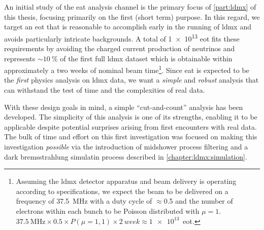 An initial study of the \ac{eat} analysis channel is the primary focus of \cref{part:ldmx} of this
thesis, focusing primarily on the first (short term) purpose. In this regard, we target an \ac{eot}
that is reasonable to accomplish early in the running of \ac{ldmx} and avoids particularly
intricate backgrounds. A total of \num{1e13} \ac{eot} fits these requirements by avoiding the
charged current production of neutrinos and represents $\sim\qty{10}{\percent}$
of the first full \ac{ldmx} dataset which is obtainable within approximately a two weeks
of nominal beam time\footnote{%
  Assuming the \ac{ldmx} detector apparatus and beam delivery is operating according to specifications,
  we expect the beam to be delivered on a frequency of \qty{37.5}{\mega\hertz} with a duty cycle of $\approx$\num{0.5} and the
  number of electrons within each bunch to be Poisson distributed with $\mu=1$.
  $\qty{37.5}{\mega\hertz}\times0.5\times P(\mu=1,1) \times\qty{2}{week}\approx\num{1e13}$~\ac{eot}.
}. Since \ac{eat} is expected to be the \emph{first} physics analysis on \ac{ldmx} data, we want a
\emph{simple} and \emph{robust} analysis that can withstand the test of time and the complexities
of real data.

With these design goals in mind, a simple ``cut-and-count'' analysis has been developed. The
simplicity of this analysis is one of its strengths, enabling it to be applicable despite potential
surprises arising from first encounters with real data. The bulk of time and effort on this first
investigation was focused on making this investigation \emph{possible} via the introduction of
midshower process filtering and a dark bremsstrahlung simulatin process described in
\cref{chapter:ldmx:simulation}.

